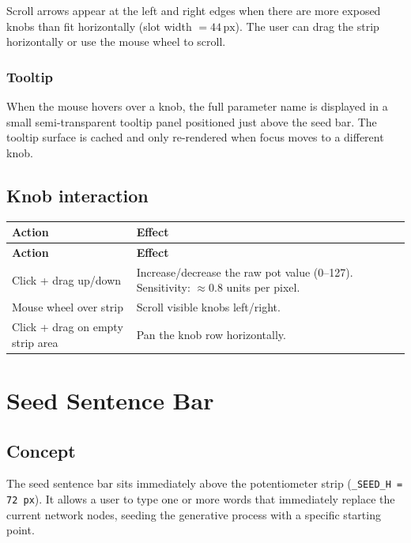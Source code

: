 \documentclass[11pt,a4paper]{report}
\begin{document}
Scroll arrows appear at the left and right edges when there are more exposed
knobs than fit horizontally (slot width $= 44\,\text{px}$).  The user can
drag the strip horizontally or use the mouse wheel to scroll.

\subsection{Tooltip}

When the mouse hovers over a knob, the full parameter name is displayed in a
small semi-transparent tooltip panel positioned just above the seed bar.  The
tooltip surface is cached and only re-rendered when focus moves to a different
knob.

\section{Knob interaction}

\begin{longtable}{>{\ttfamily}p{} p{}}
\toprule
\textbf{Action} & \textbf{Effect} \\
\midrule
\endfirsthead
\toprule
\textbf{Action} & \textbf{Effect} \\
\midrule
\endhead
Click + drag up/down & Increase/decrease the raw pot value (0--127).
  Sensitivity: $\approx 0.8$ units per pixel. \\
Mouse wheel over strip & Scroll visible knobs left/right. \\
Click + drag on empty strip area & Pan the knob row horizontally. \\
\bottomrule
\end{longtable}

\chapter{Seed Sentence Bar}

\section{Concept}

The seed sentence bar sits immediately above the potentiometer strip
(\texttt{\_SEED\_H = 72\,px}).  It allows a user to type one or more words
that immediately replace the current network nodes, seeding the generative
process with a specific starting point.
\end{document}
